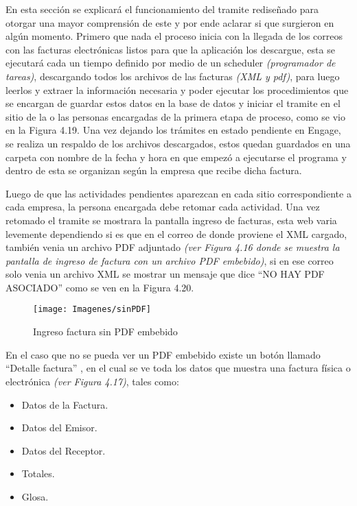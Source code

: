 		En esta sección se explicará el funcionamiento del tramite rediseñado para otorgar una mayor comprensión de este y por ende aclarar si que surgieron en algún momento. Primero que nada el proceso inicia con la llegada de los correos con las facturas electrónicas listos para que la aplicación los descargue, esta se ejecutará cada un tiempo definido por medio de un scheduler \textit{(programador de tareas)}, descargando todos los archivos de las facturas \textit{(XML y pdf)}, para luego leerlos y extraer la información necesaria y poder ejecutar los procedimientos que se encargan de guardar estos datos en la base de datos y iniciar el tramite en el sitio de la o las personas encargadas de la primera etapa de proceso, como se vio en la Figura 4.19. Una vez dejando los trámites en estado pendiente en Engage, se realiza un respaldo de los archivos descargados, estos quedan guardados en una carpeta con nombre de la fecha y hora en que empezó a ejecutarse el programa y dentro de esta se organizan según la empresa que recibe dicha factura.
		\newline
		\par
		Luego de que las actividades pendientes aparezcan en cada sitio correspondiente a cada empresa, la persona encargada debe retomar cada actividad. Una vez retomado el tramite se mostrara la pantalla ingreso de facturas, esta web varia levemente dependiendo si es que en el correo de donde proviene el XML cargado, también venia un archivo PDF adjuntado \textit{(ver Figura 4.16 donde se muestra la pantalla de ingreso de factura con un archivo PDF embebido)},  si en ese correo solo venia un archivo XML se mostrar un mensaje que dice ``NO HAY PDF ASOCIADO'' como se ven en la Figura 4.20.
		
		\begin{figure}[H]
			\texttt{[image: Imagenes/sinPDF]}
			\caption{Ingreso factura sin PDF embebido}
		\end{figure}		
		
		 En el caso que no se pueda ver un PDF embebido existe un botón llamado ``Detalle factura'' , en el cual se ve toda los datos que muestra una factura física o electrónica \textit{(ver Figura 4.17)}, tales como:
		
		\begin{itemize}
			\item Datos de la Factura.
			\item Datos del Emisor.
			\item Datos del Receptor.
			\item Totales.
			\item Glosa.
		\end{itemize}
		
